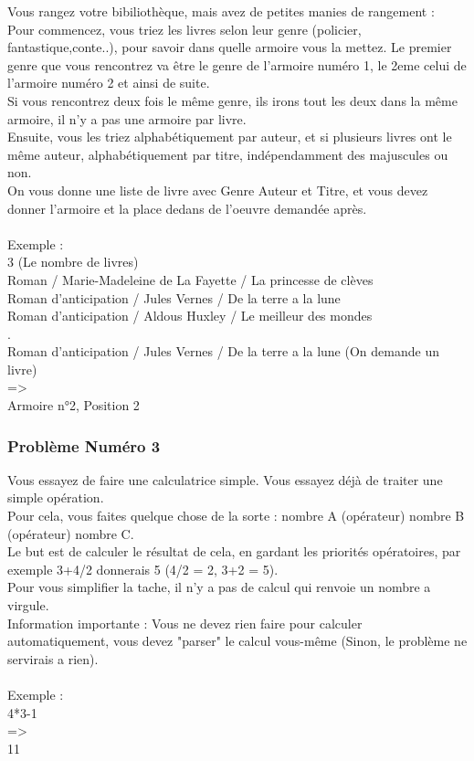 \documentclass[12pt]{article}
\begin{document}
Vous rangez votre bibiliothèque, mais avez de petites manies de rangement :\\
Pour commencez, vous triez les livres selon leur genre (policier, fantastique,conte..), pour savoir dans quelle armoire vous la mettez. Le premier genre que vous rencontrez va être le genre de l'armoire numéro 1, le 2eme celui de l'armoire numéro 2 et ainsi de suite.\\
Si vous rencontrez deux fois le même genre, ils irons tout les deux dans la même armoire, il n'y a pas une armoire par livre.\\
Ensuite, vous les triez alphabétiquement par auteur, et si plusieurs livres ont le même auteur, alphabétiquement par titre, indépendamment des majuscules ou non.\\
On vous donne une liste de livre avec Genre Auteur et Titre, et vous devez donner l'armoire et la place dedans de l'oeuvre demandée après.
\\\\
Exemple :\\
3 (Le nombre de livres)\\
Roman / Marie-Madeleine de La Fayette / La princesse de clèves\\
Roman d'anticipation / Jules Vernes / De la terre a la lune\\
Roman d'anticipation / Aldous Huxley / Le meilleur des mondes\\
.\\
Roman d'anticipation / Jules Vernes / De la terre a la lune (On demande un livre)\\
=\textgreater\\
Armoire n°2, Position 2

\subsubsection{Problème Numéro 3}

Vous essayez de faire une calculatrice simple. Vous essayez déjà de traiter une simple opération.\\
Pour cela, vous faites quelque chose de la sorte : nombre A (opérateur) nombre B (opérateur) nombre C.\\
Le but est de calculer le résultat de cela, en gardant les priorités opératoires, par exemple 3+4/2 donnerais 5 (4/2 = 2, 3+2 = 5).\\
Pour vous simplifier la tache, il n'y a pas de calcul qui renvoie un nombre a virgule.\\
Information importante : Vous ne devez rien faire pour calculer automatiquement, vous devez "parser" le calcul vous-même (Sinon, le problème ne servirais a rien).
\\\\
Exemple :\\
4*3-1\\
=\textgreater\\
11
\end{document}
